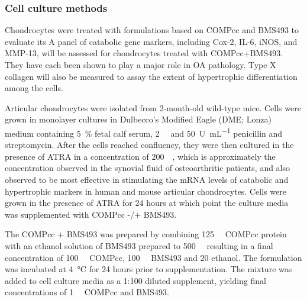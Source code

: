 \begin{refsection}
\subsubsection{Cell culture methods}
\label{sec:culture_methods}

Chondrocytes were treated with formulations based on COMPcc and BMS493 to
evaluate its A panel of catabolic gene markers, including Cox-2, IL-6, iNOS, and MMP-13, will
be assessed for chondrocytes treated with COMPcc+BMS493. They have each been
shown to play a major role in OA pathology. Type X collagen will also be
measured to assay the extent of hypertrophic differentiation among the
cells.\cite{Lotz1992,Geng1995,Malemud2013,DiCesare2002,Pichika2004,Murrell1995}

Articular chondrocytes were isolated from 2-month-old wild-type mice.  Cells
were grown in monolayer cultures in Dulbecco's Modified Eagle (DME; Lonza)
medium containing \SI{5}{\percent} fetal calf serum, \SI{2}{\milli\moLar}
 and \SI{50}{U\per\mL} penicillin and streptomycin. After
the cells reached confluency, they were then cultured in the presence of ATRA in
a concentration of \SI{200}{\nano\moLar}, which is approximately the
concentration observed in the synovial fluid of osteoarthritic
patients,\cite{Davies2009} and also observed to be most effective in stimulating
the mRNA levels of catabolic and hypertrophic markers in human and mouse
articular chondrocytes.\cite{Campbell2013b} Cells were grown in the presence of
ATRA for 24 hours at which point the culture media was supplemented with
COMPcc -/+ BMS493.

The COMPcc + BMS493 was prepared by combining \SI{125}{\micro\moLar} COMPcc protein
with an ethanol solution of BMS493 prepared to \SI{500}{\micro\moLar} resulting
in a final concentration of \SI{100}{\micro\moLar} COMPcc, \SI{100}{\micro\moLar}
BMS493 and \SI{20}{\volper} ethanol. The formulation was incubated at
\SI{4}{\celsius} for 24 hours prior to supplementation. The mixture was added to
cell culture media as a 1:100 diluted supplement, yielding final concentrations
of \SI{1}{\micro\moLar} COMPcc and BMS493.


\end{refsection}
